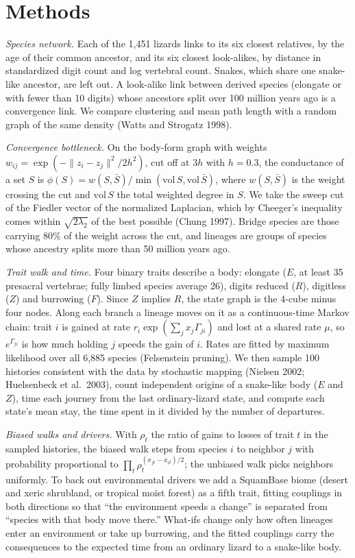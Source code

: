 \documentclass[11pt]{article}
\begin{document}
\section{Methods}

\textit{Species network.} Each of the 1,451 lizards links to its six closest relatives, by the age of their common ancestor, and its six closest look-alikes, by distance in standardized digit count and log vertebral count. Snakes, which share one snake-like ancestor, are left out. A look-alike link between derived species (elongate or with fewer than 10 digits) whose ancestors split over 100 million years ago is a convergence link. We compare clustering and mean path length with a random graph of the same density (Watts and Strogatz 1998).

\textit{Convergence bottleneck.} On the body-form graph with weights $w_{ij} = \exp(-\|z_i - z_j\|^2 / 2h^2)$, cut off at $3h$ with $h = 0.3$, the conductance of a set $S$ is $\phi(S) = w(S, \bar S) / \min(\mathrm{vol}\, S, \mathrm{vol}\, \bar S)$, where $w(S, \bar S)$ is the weight crossing the cut and $\mathrm{vol}\, S$ the total weighted degree in $S$. We take the sweep cut of the Fiedler vector of the normalized Laplacian, which by Cheeger's inequality comes within $\sqrt{2\lambda_2}$ of the best possible (Chung 1997). Bridge species are those carrying 80\% of the weight across the cut, and lineages are groups of species whose ancestry splits more than 50 million years ago.

\textit{Trait walk and time.} Four binary traits describe a body: elongate ($E$, at least 35 presacral vertebrae; fully limbed species average 26), digits reduced ($R$), digitless ($Z$) and burrowing ($F$). Since $Z$ implies $R$, the state graph is the 4-cube minus four nodes. Along each branch a lineage moves on it as a continuous-time Markov chain: trait $i$ is gained at rate $r_i \exp(\sum_j x_j \Gamma_{ji})$ and lost at a shared rate $\mu$, so $e^{\Gamma_{ji}}$ is how much holding $j$ speeds the gain of $i$. Rates are fitted by maximum likelihood over all 6,885 species (Felsenstein pruning). We then sample 100 histories consistent with the data by stochastic mapping (Nielsen 2002; Huelsenbeck et al.\ 2003), count independent origins of a snake-like body ($E$ and $Z$), time each journey from the last ordinary-lizard state, and compute each state's mean stay, the time spent in it divided by the number of departures.

\textit{Biased walks and drivers.} With $\rho_t$ the ratio of gains to losses of trait $t$ in the sampled histories, the biased walk steps from species $i$ to neighbor $j$ with probability proportional to $\prod_t \rho_t^{(x_{jt} - x_{it})/2}$; the unbiased walk picks neighbors uniformly. To back out environmental drivers we add a SquamBase biome (desert and xeric shrubland, or tropical moist forest) as a fifth trait, fitting couplings in both directions so that ``the environment speeds a change'' is separated from ``species with that body move there.'' What-ifs change only how often lineages enter an environment or take up burrowing, and the fitted couplings carry the consequences to the expected time from an ordinary lizard to a snake-like body.
\end{document}
